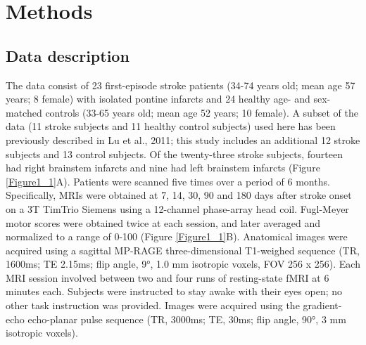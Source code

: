 \documentclass[phd,tocprelim]{cornell}
\begin{document}
\section{Methods}

	\subsection{Data description}
	 The data consist of 23 first-episode stroke patients (34-74 years old; mean age 57 years; 8 female) with isolated pontine infarcts and 24 healthy age- and sex-matched controls (33-65 years old; mean age 52 years; 10 female). A subset of the data (11 stroke subjects and 11 healthy control subjects) used here has been previously described in Lu et al., 2011; this study includes an additional 12 stroke subjects and 13 control subjects. Of the twenty-three stroke subjects, fourteen  had right brainstem infarcts and nine had left brainstem infarcts (Figure \ref{Figure1_1}A). Patients were scanned five times over a period of 6 months. Specifically, MRIs were obtained at 7, 14, 30, 90 and 180 days after stroke onset on a 3T TimTrio Siemens using a 12-channel phase-array head coil. Fugl-Meyer motor scores were obtained twice at each session, and later averaged and normalized to a range of 0-100 (Figure \ref{Figure1_1}B). Anatomical images were acquired using a sagittal MP-RAGE three-dimensional T1-weighed sequence (TR, 1600ms; TE 2.15ms; flip angle, 9°, 1.0 mm isotropic voxels, FOV 256 x 256). Each MRI session involved between two and four runs of resting-state fMRI at 6 minutes each. Subjects were instructed to stay awake with their eyes open; no other task instruction was provided. Images were acquired using the gradient-echo echo-planar pulse sequence (TR, 3000ms; TE, 30ms; flip angle, 90°, 3 mm isotropic voxels).
\end{document}
